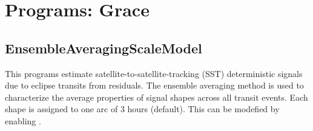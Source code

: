 \clearpage
\section{Programs: Grace}
\subsection{EnsembleAveragingScaleModel}\label{EnsembleAveragingScaleModel}
This programs estimate satellite-to-satellite-tracking (SST) deterministic signals due to eclipse transits from residuals.
The ensemble averaging method is used to characterize the average properties of signal shapes across all transit events.
Each shape is assigned to one arc of 3 hours (default). This can be modefied by enabling .


